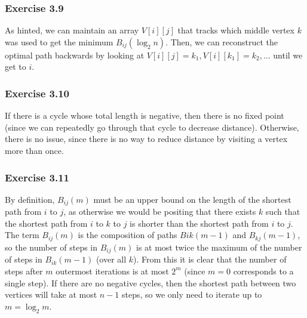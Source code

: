 \subsubsection{Exercise 3.9}
As hinted, we can maintain an array $V[i][j]$ that tracks which middle vertex $k$ was used to get the minimum 
$B_{ij}(\log_2 n)$. Then, we can reconstruct the optimal path backwards by looking at
$V[i][j] = k_1, V[i][k_1] = k_2, ...$ until we get to $i$.

\subsubsection{Exercise 3.10}
If there is a cycle whose total length is negative, then there is no fixed point (since we can repeatedly go
through that cycle to decrease distance). Otherwise, there is no issue, since there is no way to reduce
distance by visiting a vertex more than once.

\subsubsection{Exercise 3.11}
By definition, $B_{ij}(m)$ must be an upper bound on the length of the shortest path from $i$ to $j$, as 
otherwise we would be positing that there exists $k$ such that the shortest path from $i$ to $k$ to $j$ is
shorter than the shortest path from  $i$ to  $j$. The term $B_{ij}(m)$ is the composition of paths 
$B{ik}(m-1)$ and  $B_{kj}(m-1)$, so the number of steps in $B_{ij}(m)$ is at most twice the maximum of
the number of steps in $B_{ik}(m-1)$ (over all $k$). From this it is clear that the number of steps after
$m$ outermost iterations is at most $2^m$ (since $m = 0$ corresponds to a single step). If there are no
negative cycles, then the shortest path between two vertices will take at most $n-1$ steps, so we only need
to iterate up to $m = \log_2 m$.
